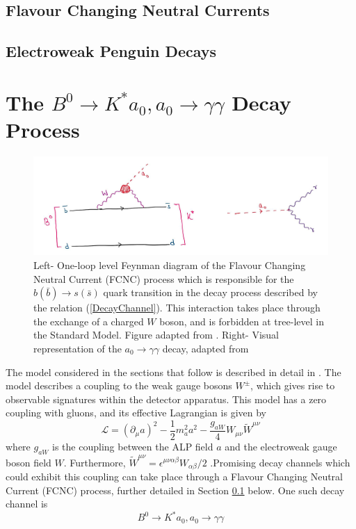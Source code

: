 \subsection{Flavour Changing Neutral Currents}\label{FCNC}

\subsection{Electroweak Penguin Decays}
\section{The $B^{0}\rightarrow K^{*}a_{0}, a_{0}\rightarrow\gamma\gamma$ Decay Process} 
\begin{figure}[H]
    \centering
    \includegraphics[scale=0.45]{FCNCALP.jpg}
    \caption{Left- One-loop level Feynman diagram of the Flavour Changing Neutral Current (FCNC) process which is responsible for the $b(\bar{b})\rightarrow s(\bar{s})$ quark transition in the decay process described by the relation (\ref{DecayChannel}). This interaction takes place through the exchange of a charged $W$ boson, and is forbidden at tree-level in the Standard Model. Figure adapted from \cite{Izaguirre2016ANF}. Right- Visual representation of the $a_{0}\rightarrow\gamma\gamma$ decay, adapted from \cite{Michael:920}}
\end{figure}
The model considered in the sections that follow is described in detail in \cite{Izaguirre2016ANF}. The model describes a
coupling to the weak gauge bosons $W^{\pm}$, which gives rise to observable signatures within the detector apparatus. This model has a
zero coupling with gluons, and its effective Lagrangian is given by
\begin{equation}
    \mathcal{L} = (\partial_{\mu}a)^{2}-\frac{1}{2}m_{a}^{2}a^{2}-\frac{g_{aW}}{4}W_{\mu\nu}\tilde{W}^{\mu\nu}
\end{equation}
where $g_{aW}$ is the coupling between the ALP field $a$ and the electroweak gauge boson field $W$. Furthermore, $\tilde{W}^{\mu\nu} = \epsilon^{\mu\nu\alpha\beta}W_{\alpha\beta}/2$ \cite{Izaguirre2016ANF}.Promising decay channels which could exhibit this coupling can take
place through a Flavour Changing Neutral Current (FCNC) process, further detailed in Section \ref{FCNC} below. One such decay channel is 
\begin{equation}\label{DecayChannel}
    B^{0}\rightarrow K^{*}a_{0}, a_{0}\rightarrow\gamma\gamma
\end{equation}

